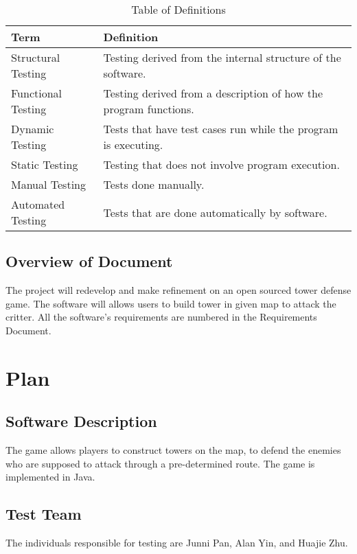 \documentclass[12pt]{article}
\begin{document}
		
    \begin{table}[!htbp]

	\begin{tabular}[r]{|l|l|}

		\hline
		\textbf{Term}& \textbf{Definition} \\ \hline
		Structural Testing & Testing derived from the internal structure of the software. \\ \hline
		Functional Testing & Testing derived from a description of how the program functions.  \\ \hline 
		Dynamic Testing & Tests that have test cases run while the program is executing. \\ \hline
		Static Testing & Testing that does not involve program execution.  \\ \hline  
		Manual Testing & Tests done manually. \\ \hline
		Automated Testing & Tests that are done automatically by software. \\ \hline 
		
	\end{tabular}
		\caption{Table of Definitions}
		\label{Table}
    \end{table}	
	
    \subsection{Overview of Document}
	The project will redevelop and make refinement on an open sourced tower defense game. The software will allows users to build tower in given map to attack the critter. All the software's requirements are numbered in the Requirements Document. 

	\section{Plan}
	
	\subsection{Software Description}
	The game allows players to construct towers on the map, to defend the enemies who are supposed to attack through a pre-determined route. The game is implemented in Java.
	
	\subsection{Test Team}
	The individuals responsible for testing are Junni Pan, Alan Yin, and Huajie Zhu.
\end{document}
